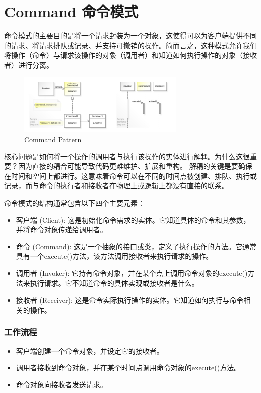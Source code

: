 \section{Command 命令模式}

命令模式的主要目的是将一个请求封装为一个对象，这使得可以为客户端提供不同的请求、将请求排队或记录、并支持可撤销的操作。简而言之，这种模式允许我们将操作（命令）与请求该操作的对象（调用者）和知道如何执行操作的对象（接收者）进行分离。

\begin{figure}[h]
    \centering
    \includegraphics[width=8cm]{res/W3sDesign_Command_Design_Pattern_UML.jpg}
    \caption{Command Pattern}
\end{figure}

核心问题是如何将一个操作的调用者与执行该操作的实体进行解耦。为什么这很重要？因为直接的耦合可能导致代码更难维护、扩展和重构。
解耦的关键是要确保在时间和空间上都进行。这意味着命令可以在不同的时间点被创建、排队、执行或记录，而与命令的执行者和接收者在物理上或逻辑上都没有直接的联系。

命令模式的结构通常包含以下四个主要元素：
\begin{itemize}
	\item 客户端 (Client): 这是初始化命令需求的实体。它知道具体的命令和其参数，并将命令对象传递给调用者。
	\item 命令 (Command): 这是一个抽象的接口或类，定义了执行操作的方法。它通常具有一个execute()方法，该方法调用接收者来执行请求的操作。
	\item 调用者 (Invoker): 它持有命令对象，并在某个点上调用命令对象的execute()方法来执行请求。它不知道命令的具体实现或接收者是什么。
	\item 接收者 (Receiver): 这是命令实际执行操作的实体。它知道如何执行与命令相关的操作。
\end{itemize}

\subsubsection{工作流程}
\begin{itemize}
	\item 客户端创建一个命令对象，并设定它的接收者。
	\item 调用者接收到命令对象，并在某个时间点调用命令对象的execute()方法。
	\item 命令对象向接收者发送请求。
\end{itemize}
